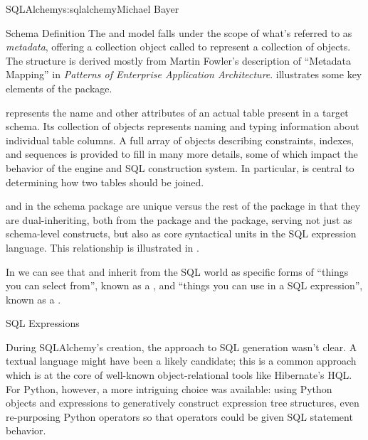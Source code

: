 \begin{aosachapter}{SQLAlchemy}{s:sqlalchemy}{Michael Bayer}
\begin{aosasect1}{Schema Definition}
The  and  model falls under the scope of what's
referred to as \emph{metadata}, offering a collection object called  to represent
a collection of  objects.  The structure is derived
mostly from Martin Fowler's description of ``Metadata Mapping'' in
\emph{Patterns of Enterprise Application Architecture}. %
 illustrates
some key elements of the  package.


 represents the name and other attributes of an actual table
present in a target schema.  Its collection of  objects
represents naming and typing information about individual table columns.
A full array of objects describing constraints, indexes, and sequences
is provided to fill in many more details, some of which impact the
behavior of the engine and SQL construction system.  In particular, 
is central to determining how two tables should be joined.

 and  in the schema package are unique versus the rest of the
package in that they are dual-inheriting, both from the  package and
the  package, serving not just as schema-level
constructs, but also as core syntactical units in the SQL expression language.
This relationship is illustrated in .


In  we can see that  and  inherit from the SQL world as
specific forms of ``things you can select from'', known as a ,
and ``things you can use in a SQL expression'', known as a .

\end{aosasect1}

\begin{aosasect1}{SQL Expressions}

During SQLAlchemy's creation, the
approach to SQL generation wasn't clear. A textual
language might have been a likely candidate; this is a common
approach which is at the core of well-known object-relational tools
like Hibernate's HQL. For Python, however, a more intriguing
choice was available: using Python objects and expressions
to generatively construct expression tree structures, even
re-purposing Python operators so that operators
could be given SQL statement behavior.


\end{aosasect1}
\end{aosachapter}

